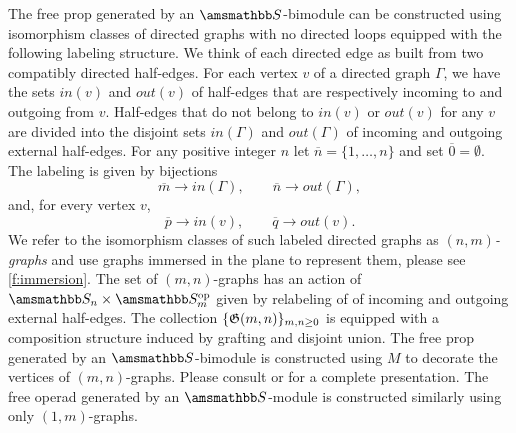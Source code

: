 The free prop generated by an $\S$-bimodule can be constructed using isomorphism classes of directed graphs with no directed loops equipped with the following labeling structure.
We think of each directed edge as built from two compatibly directed half-edges. For each vertex $v$ of a directed graph $\Gamma$, we have the sets $in(v)$ and $out(v)$ of half-edges that are respectively incoming to and outgoing from $v$. Half-edges that do not belong to $in(v)$ or $out(v)$ for any $v$ are divided into the disjoint sets $in(\Gamma)$ and $out(\Gamma)$ of incoming and outgoing external half-edges.
For any positive integer $n$ let $\overline{n} = \{1,\dots,n\}$ and set $\overline{0} = \emptyset$.
The labeling is given by bijections  
\begin{equation*}
\overline{m} \to in(\Gamma), \qquad
\overline{n} \to out(\Gamma),
\end{equation*}
and, for every vertex $v$,
\begin{equation*}
\overline{p} \to in(v), \qquad
\overline{q} \to out(v).
\end{equation*}
We refer to the isomorphism classes of such labeled directed graphs as $(n,m)$\textit{-graphs} and use graphs immersed in the plane to represent them, please see \cref{f:immersion}.
The set of $(m,n)$-graphs has an action of $\S_n \times \S_m^{\op}$ given by relabeling of of incoming and outgoing external half-edges.
The collection $\{\mathfrak{G}(m,n)\}_{m,n \geq 0}$ is equipped with a composition structure induced by grafting and disjoint union.
The free prop generated by an $\S$-bimodule is constructed using $M$ to decorate the vertices of $(m,n)$-graphs.
Please consult \cite{Markl08} or \cite{Fresse2010props} for a complete presentation.
The free operad generated by an $\S$-module is constructed similarly using only $(1,m)$-graphs.

